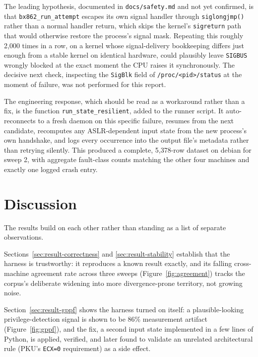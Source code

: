\documentclass[11pt]{article}
\newcommand{\code}[1]{\texttt{#1}}
\begin{document}
The leading hypothesis, documented in \code{docs/safety.md} and not yet
confirmed, is that \code{bx862\_run\_attempt} escapes its own signal
handler through \code{siglongjmp()} rather than a normal handler return,
which skips the kernel's \code{sigreturn} path that would otherwise
restore the process's signal mask. Repeating this roughly 2{,}000 times
in a row, on a kernel whose signal-delivery bookkeeping differs just
enough from a stable kernel on identical hardware, could plausibly leave
\code{SIGBUS} wrongly blocked at the exact moment the CPU raises it
synchronously. The decisive next check, inspecting the \code{SigBlk}
field of \code{/proc/<pid>/status} at the moment of failure, was not
performed for this report.

The engineering response, which should be read as a workaround rather
than a fix, is the function \code{run\_state\_resilient}, added to the
runner script. It auto-reconnects to a fresh daemon on this specific
failure, resumes from the next candidate, recomputes any ASLR-dependent
input state from the new process's own handshake, and logs every
occurrence into the output file's metadata rather than retrying
silently. This produced a complete, 5{,}378-row dataset on debian for
sweep 2, with aggregate fault-class counts matching the other four
machines and exactly one logged crash entry.

\section{Discussion}

The results build on each other rather than standing as a list of
separate observations.

Sections~\ref{sec:result-correctness} and \ref{sec:result-stability}
establish that the harness is trustworthy: it reproduces a known result
exactly, and its falling cross-machine agreement rate across three
sweeps (Figure~\ref{fig:agreement}) tracks the corpus's deliberate
widening into more divergence-prone territory, not growing noise.

Section~\ref{sec:result-gppf} shows the harness turned on itself: a
plausible-looking privilege-detection signal is shown to be 86\%
measurement artifact (Figure~\ref{fig:gppf}), and the fix, a second
input state implemented in a few lines of Python, is applied, verified,
and later found to validate an unrelated architectural rule (PKU's
\code{ECX=0} requirement) as a side effect.
\end{document}
